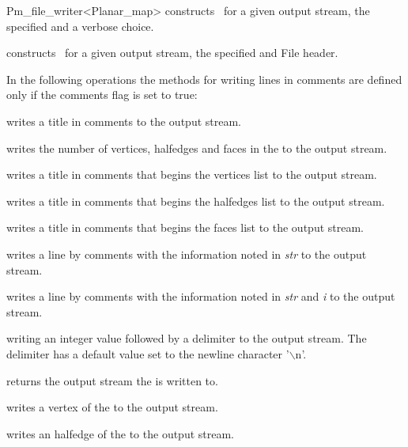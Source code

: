\begin{ccRefClass}{Pm_file_writer<Planar_map>}
{constructs \ccRefName\ for a given output stream, the specified  and a verbose choice.}

{constructs \ccRefName\ for a given output stream, the specified  and {File header}.}

\ccOperations

In the following operations the methods for writing lines in 
comments are defined only if the comments flag is set to true:

{writes a title in comments to the output stream.}

{writes the number of vertices, halfedges and faces in the  to the output stream.}

{writes a title in comments that begins the vertices list to the output stream.}

{writes a title in comments that begins the halfedges list to the output stream.}

{writes a title in comments that begins the faces list to the output stream.}

{writes a line by comments with the information noted in {\em str} to the output stream.}

{writes a line by comments with the information noted in {\em str} and {\em i} to the output stream.}

{writing an integer value followed by a delimiter to the output stream.
 The delimiter has a default value set to the newline character 
 '$\backslash$n'.}

{returns the output stream the  is written to.} 

{writes a vertex of the  to the output stream.}

{writes an halfedge of the  to the output stream.}


\end{ccRefClass}

